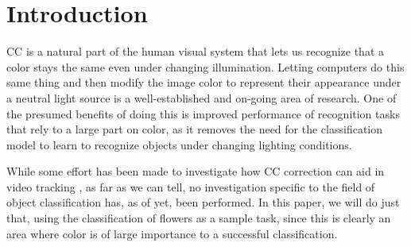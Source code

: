 \section{Introduction}

\gls{CC} is a natural part of the human visual system that lets us recognize that a color
stays the same even under changing illumination. Letting computers do this same thing and then
modify the image color to represent their appearance under a neutral light source is a well-established
and on-going area of research. One of the presumed benefits of doing this is improved performance
of recognition tasks that rely to a large part on color, as it removes the need for the classification
model to learn to recognize objects under changing lighting conditions.

While some effort has been made to investigate how \gls{CC} correction can aid in video tracking
\cite{Agarwal2006}, as far as we can tell, no investigation specific to the field of object
classification has, as of yet, been performed. In this paper, we will do just that, using the
classification of flowers as a sample task, since this is clearly an area where color is of large
importance to a successful classification.

